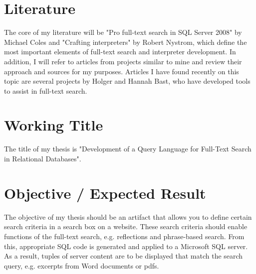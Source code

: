 \section{Literature}
The core of my literature will be "Pro full-text search in SQL Server 2008" by Michael Coles and "Crafting interpreters" by Robert Nystrom, which define the most important elements of full-text search and interpreter development. In addition, I will refer to articles from projects similar to mine and review their approach and sources for my purposes. Articles I have found recently on this topic are several projects by Holger and Hannah Bast, who have developed tools to assist in full-text search.
\section{Working Title}
The title of my thesis is "Development of a Query Language for Full-Text Search in Relational Databases".
\section{Objective / Expected Result }
The objective of my thesis should be an artifact that allows you to define certain search criteria in a search box on a website. These search criteria should enable functions of the full-text search, e.g. reflections and phrase-based search. From this, appropriate SQL code is generated and applied to a Microsoft SQL server. As a result, tuples of server content are to be displayed that match the search query, e.g. excerpts from Word documents or pdfs.